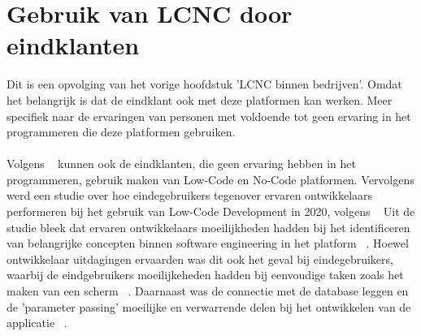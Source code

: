 \section{Gebruik van LCNC door eindklanten}
\label{sec:lcnc-eindklanten}
Dit is een opvolging van het vorige hoofdstuk 'LCNC binnen bedrijven'. Omdat het belangrijk is dat de eindklant ook met deze platformen kan werken.
Meer specifiek naar de ervaringen van personen met voldoende  tot geen ervaring in het programmeren die deze platformen gebruiken.
\\
\\
Volgens ~\textcite{Yan2021} kunnen ook de eindklanten, die geen ervaring hebben in het programmeren, gebruik maken van Low-Code en No-Code platformen.
Vervolgens werd een studie over hoe eindegebruikers tegenover ervaren ontwikkelaars performeren bij het gebruik van Low-Code Development  in 2020, volgens ~\textcite{Hintsch2021} 
Uit de studie bleek dat ervaren ontwikkelaars moeilijkheden hadden bij het identificeren van belangrijke concepten binnen software engineering in het platform ~\autocite{Hintsch2021}.
Hoewel ontwikkelaar uitdagingen ervaarden was dit ook het geval bij eindegebruikers, waarbij de eindgebruikers moeilijkeheden hadden bij eenvoudige taken zoals het maken van een scherm  ~\autocite{Hintsch2021}.
Daarnaast was de connectie met de database leggen en de 'parameter passing' moeilijke en verwarrende delen bij het ontwikkelen van de applicatie  ~\autocite{Hintsch2021}.





